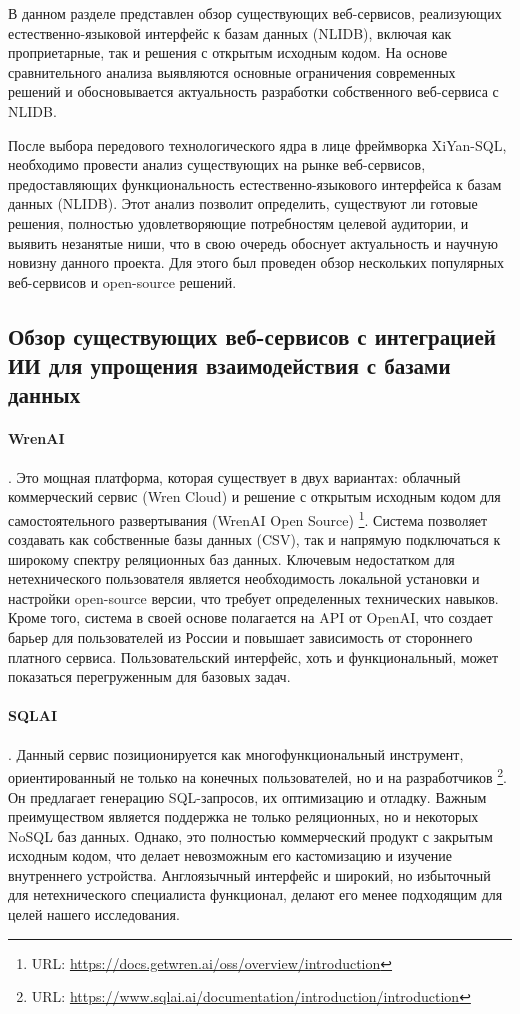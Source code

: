 \begin{annotation}
	В данном разделе представлен обзор существующих веб-сервисов, реализующих естественно-языковой
	интерфейс к базам данных (NLIDB), включая как проприетарные, так и решения с открытым исходным кодом.
	На основе сравнительного анализа выявляются основные
	ограничения современных решений и обосновывается актуальность
	разработки собственного веб-сервиса с NLIDB.
\end{annotation}

После выбора передового технологического ядра в лице фреймворка XiYan-SQL,
необходимо провести анализ существующих на рынке веб-сервисов, предоставляющих
функциональность естественно-языкового интерфейса к базам данных (NLIDB).
Этот анализ позволит определить, существуют ли готовые решения, полностью
удовлетворяющие потребностям целевой аудитории, и выявить незанятые ниши,
что в свою очередь обоснует актуальность и научную новизну данного проекта.
Для этого был проведен обзор нескольких популярных веб-сервисов и
open-source решений.

\subsection{Обзор существующих веб-сервисов с интеграцией ИИ для упрощения
	взаимодействия с базами данных}

\paragraph{WrenAI}. Это мощная платформа, которая существует в двух вариантах:
облачный коммерческий сервис (Wren Cloud) и решение с открытым исходным кодом
для самостоятельного развертывания (WrenAI Open Source)
\footnote{URL: \url{https://docs.getwren.ai/oss/overview/introduction}}.
Система позволяет создавать как собственные базы данных (CSV), так и напрямую подключаться к
широкому спектру реляционных баз данных. Ключевым недостатком для нетехнического
пользователя является необходимость локальной установки и настройки open-source версии,
что требует определенных технических навыков. Кроме того, система в своей основе полагается
на API от OpenAI, что создает барьер для пользователей из России и повышает зависимость
от стороннего платного сервиса. Пользовательский интерфейс, хоть и функциональный, может
показаться перегруженным для базовых задач.

\paragraph{SQLAI}. Данный сервис позиционируется как многофункциональный инструмент,
ориентированный не только на конечных пользователей, но и на разработчиков
\footnote{URL: \url{https://www.sqlai.ai/documentation/introduction/introduction}}.
Он предлагает генерацию SQL-запросов, их оптимизацию и отладку. Важным преимуществом
является поддержка не только реляционных, но и некоторых NoSQL баз данных. Однако, это
полностью коммерческий продукт с закрытым исходным кодом, что делает невозможным его
кастомизацию и изучение внутреннего устройства. Англоязычный интерфейс и широкий, но
избыточный для нетехнического специалиста функционал, делают его менее подходящим для
целей нашего исследования.


